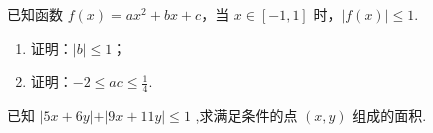 \documentclass[a4paper , final]{ctexart}
\newenvironment{problem}[1]{%
  \item #1
  \par
  \vspace{8cm}
}{}
\begin{document}
\begin{problems}
  \begin{problem}
  {
  已知函数 $f(x) = ax^2 + bx + c$，当 $x \in [-1, 1]$ 时，$|f(x)| \le 1$.
  \begin{enumerate}[label=(\arabic*)]
    \item 证明：$|b| \le 1$；
    \item 证明：$-2 \le ac \le \frac{1}{4}$.
  \end{enumerate}
  }
  \end{problem}

  \begin{problem}
  {
  已知 $\vert 5x+6y\vert +\vert 9x+11y\vert \leq 1$ ,求满足条件的点 $(x,y)$ 组成的面积.
  }
  \end{problem}
\end{problems}
\end{document}
